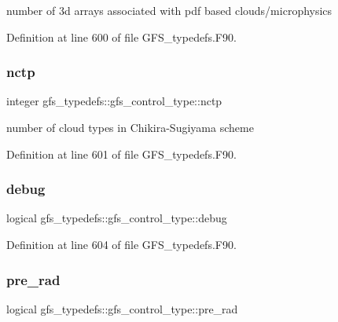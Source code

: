 number of 3d arrays associated with pdf based clouds/microphysics 



Definition at line 600 of file G\+F\+S\+\_\+typedefs.\+F90.

\mbox{\label{structgfs__typedefs_1_1gfs__control__type_ab6d28fbdeb6e7c69e6c06ced1c053775}} 
\subsubsection{nctp}
{\footnotesize\ttfamily integer gfs\+\_\+typedefs\+::gfs\+\_\+control\+\_\+type\+::nctp}



number of cloud types in Chikira-\/\+Sugiyama scheme 



Definition at line 601 of file G\+F\+S\+\_\+typedefs.\+F90.

\mbox{\label{structgfs__typedefs_1_1gfs__control__type_a5820ee90e80c34dfcb9a9ed2836acc93}} 
\subsubsection{debug}
{\footnotesize\ttfamily logical gfs\+\_\+typedefs\+::gfs\+\_\+control\+\_\+type\+::debug}



Definition at line 604 of file G\+F\+S\+\_\+typedefs.\+F90.

\mbox{\label{structgfs__typedefs_1_1gfs__control__type_a413121c3d1f112107344e261fead66ab}} 
\subsubsection{pre\+\_\+rad}
{\footnotesize\ttfamily logical gfs\+\_\+typedefs\+::gfs\+\_\+control\+\_\+type\+::pre\+\_\+rad}



